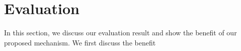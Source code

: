 \section{Evaluation}


In this section, we discuss our evaluation result and show the benefit of our proposed mechanism. We first discuss the benefit


